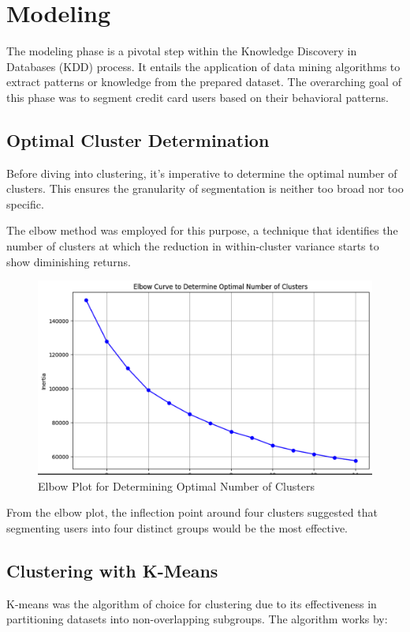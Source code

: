 \documentclass[12pt]{article}
\begin{document}
\section{Modeling}

The modeling phase is a pivotal step within the Knowledge Discovery in Databases (KDD) process. It entails the application of data mining algorithms to extract patterns or knowledge from the prepared dataset. The overarching goal of this phase was to segment credit card users based on their behavioral patterns.

\subsection{Optimal Cluster Determination}

Before diving into clustering, it's imperative to determine the optimal number of clusters. This ensures the granularity of segmentation is neither too broad nor too specific. 

The elbow method was employed for this purpose, a technique that identifies the number of clusters at which the reduction in within-cluster variance starts to show diminishing returns. 

\begin{figure}[H]
    \centering
    \includegraphics[width=0.7\linewidth]{elbow_plot.png}
    \caption{Elbow Plot for Determining Optimal Number of Clusters}
    \label{fig:elbow_plot}
\end{figure}

From the elbow plot, the inflection point around four clusters suggested that segmenting users into four distinct groups would be the most effective.

\subsection{Clustering with K-Means}

K-means was the algorithm of choice for clustering due to its effectiveness in partitioning datasets into non-overlapping subgroups. The algorithm works by:
\end{document}

